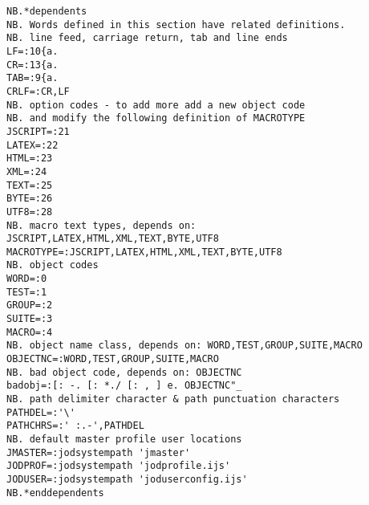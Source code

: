 \begin{lstlisting}[frame=single,framerule=0pt,basicstyle=\ttfamily\footnotesize]
NB.*dependents 
NB. Words defined in this section have related definitions.
NB. line feed, carriage return, tab and line ends
LF=:10{a.
CR=:13{a.
TAB=:9{a.
CRLF=:CR,LF
NB. option codes - to add more add a new object code
NB. and modify the following definition of MACROTYPE
JSCRIPT=:21
LATEX=:22
HTML=:23
XML=:24
TEXT=:25
BYTE=:26
UTF8=:28
NB. macro text types, depends on: JSCRIPT,LATEX,HTML,XML,TEXT,BYTE,UTF8
MACROTYPE=:JSCRIPT,LATEX,HTML,XML,TEXT,BYTE,UTF8
NB. object codes
WORD=:0
TEST=:1
GROUP=:2
SUITE=:3
MACRO=:4
NB. object name class, depends on: WORD,TEST,GROUP,SUITE,MACRO
OBJECTNC=:WORD,TEST,GROUP,SUITE,MACRO
NB. bad object code, depends on: OBJECTNC
badobj=:[: -. [: *./ [: , ] e. OBJECTNC"_
NB. path delimiter character & path punctuation characters
PATHDEL=:'\'
PATHCHRS=:' :.-',PATHDEL
NB. default master profile user locations
JMASTER=:jodsystempath 'jmaster'
JODPROF=:jodsystempath 'jodprofile.ijs'
JODUSER=:jodsystempath 'joduserconfig.ijs'
NB.*enddependents
\end{lstlisting}

